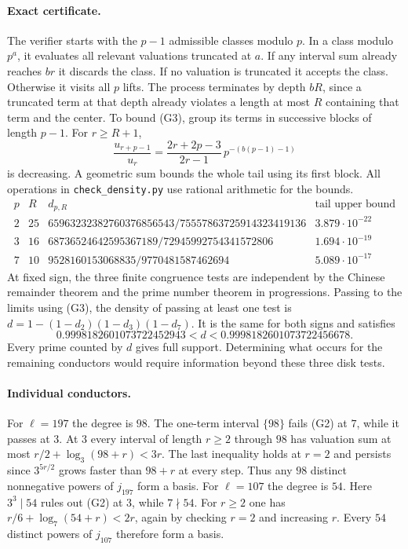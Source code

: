 \paragraph{Exact certificate.}
The verifier starts with the $p-1$ admissible classes modulo $p$.
In a class modulo $p^a$, it evaluates all relevant valuations truncated
at $a$. If any interval sum already reaches $br$ it discards the
class. If no valuation is truncated it accepts the class. Otherwise
it visits all $p$ lifts. The process terminates by depth $bR$, since
a truncated term at that depth already violates a length at most $R$
containing that term and the center. To bound (G3), group its terms
in successive blocks of length $p-1$. For $r\ge R+1$,
\[
 \frac{u_{r+p-1}}{u_r}=
 \frac{2r+2p-3}{2r-1}\,p^{-(b(p-1)-1)}
\]
is decreasing. A geometric sum bounds the whole tail using its first
block. All operations in \texttt{check\_density.py} use rational
arithmetic for the bounds.
\[
\begin{array}{c|c|c|c}
p & R & d_{p,R} & \text{tail upper bound}\\ \hline
2&25&65963232382760376856543/75557863725914323419136 &3.879\cdot10^{-22}\\
3&16&68736524642595367189/72945992754341572806 &1.694\cdot10^{-19}\\
7&10&9528160153068835/9770481587462694 &5.089\cdot10^{-17}
\end{array}
\]
At fixed sign, the three finite congruence tests are independent by the
Chinese remainder theorem and the prime number theorem in progressions.
Passing to the limits using (G3), the density of passing at least one test
is $d=1-(1-d_2)(1-d_3)(1-d_7)$. It is the same for both signs and satisfies
\[
 0.9998182601073722452943 < d < 0.9998182601073722456678 .
\]
Every prime counted by $d$ gives full support. Determining what occurs
for the remaining conductors would require information beyond these
three disk tests.

\paragraph{Individual conductors.}
For $\ell=197$ the degree is $98$. The one-term interval $\{98\}$
fails (G2) at $7$, while it passes at $3$. At $3$ every interval of
length $r\ge2$ through $98$ has valuation sum at most
$r/2+\log_3(98+r)<3r$. The last inequality holds at $r=2$ and
persists since $3^{5r/2}$ grows faster than $98+r$ at every step.
Thus any $98$ distinct nonnegative powers of $j_{197}$ form a basis.
For $\ell=107$ the degree is $54$. Here $3^3\mid54$ rules out (G2)
at $3$, while $7\nmid54$. For $r\ge2$ one has
$r/6+\log_7(54+r)<2r$, again by checking $r=2$ and increasing $r$.
Every $54$ distinct powers of $j_{107}$ therefore form a basis.

